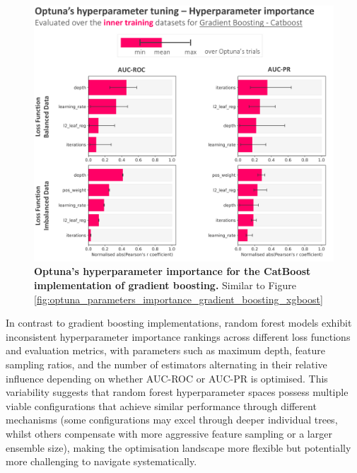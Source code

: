 \documentclass[nhess, manuscript]{copernicus}
\begin{document}
\begin{figure}[t]
\includegraphics[width=12cm]{figures/optuna_parameters_importance_gradient_boosting_catboost.png}
\caption{\textbf{Optuna's hyperparameter importance for the CatBoost implementation of gradient boosting.} Similar to Figure \ref{fig:optuna_parameters_importance_gradient_boosting_xgboost}}
\label{fig:optuna_parameters_importance_gradient_boosting_catboost}
\end{figure}

In contrast to gradient boosting implementations, random forest models exhibit inconsistent hyperparameter importance rankings across different loss functions and evaluation metrics, with parameters such as maximum depth, feature sampling ratios, and the number of estimators alternating in their relative influence depending on whether AUC-ROC or AUC-PR is optimised. This variability suggests that random forest hyperparameter spaces possess multiple viable configurations that achieve similar performance through different mechanisms (some configurations may excel through deeper individual trees, whilst others compensate with more aggressive feature sampling or a larger ensemble size), making the optimisation landscape more flexible but potentially more challenging to navigate systematically.
\end{document}
